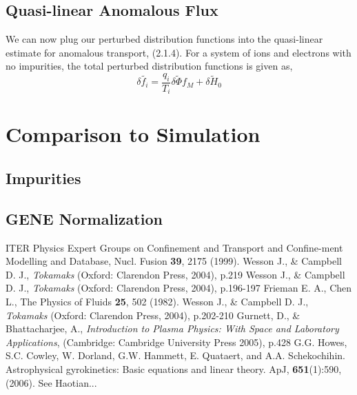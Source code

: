 \documentclass[12pt]{article}
\numberwithin{equation}{subsection}
\begin{document}
\subsection{Quasi-linear Anomalous Flux}
   \quad We can now plug our perturbed distribution functions into the quasi-linear estimate for anomalous transport, (2.1.4). For a
system of ions and electrons with no impurities, the total perturbed distribution functions is given as,
   \begin{equation}
      \delta \widetilde{f_i} = \frac{q_i}{T_i}\delta\widetilde{\Phi}f_M + \delta\widetilde{H}_0
   \end{equation}


\section{Comparison to Simulation}

\subsection{Impurities}

\subsection{GENE Normalization}


\begin{thebibliography}{0}
   
    ITER Physics Expert Groups on Confinement and Transport and Confine-ment Modelling and Database, Nucl. Fusion \textbf{39}, 2175 (1999).
    Wesson J., \& Campbell D. J., \textit{Tokamaks} (Oxford: Clarendon Press, 2004), p.219
    Wesson J., \& Campbell D. J., \textit{Tokamaks} (Oxford: Clarendon Press, 2004), p.196-197
    Frieman E. A., Chen L., The Physics of Fluids \textbf{25}, 502 (1982).
    Wesson J., \& Campbell D. J., \textit{Tokamaks} (Oxford: Clarendon Press, 2004), p.202-210
    Gurnett, D., \& Bhattacharjee, A., \textit{Introduction to Plasma Physics: With Space and Laboratory Applications},
                       (Cambridge: Cambridge University Press 2005), p.428
    G.G. Howes, S.C. Cowley, W. Dorland, G.W. Hammett, E. Quataert, and A.A. Schekochihin.
                         Astrophysical gyrokinetics: Basic equations and linear theory. ApJ, \textbf{651}(1):590, (2006).
    See Haotian...

\end{thebibliography}
    
\end{document}
